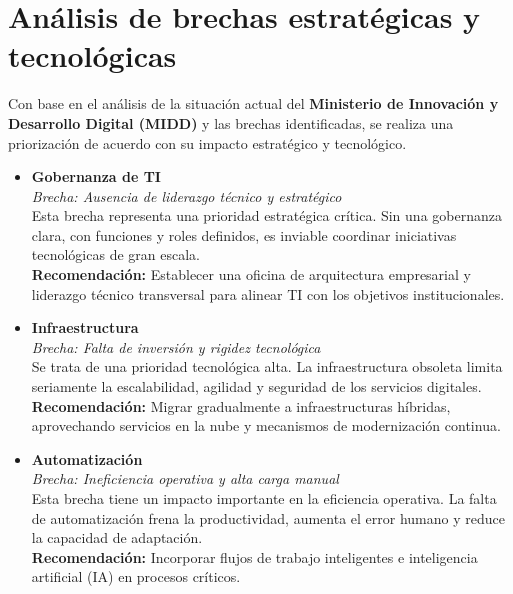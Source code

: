
\section*{Análisis de brechas estratégicas y tecnológicas}

Con base en el análisis de la situación actual del \textbf{Ministerio de Innovación y Desarrollo Digital (MIDD)} y las brechas identificadas, se realiza una priorización de acuerdo con su impacto estratégico y tecnológico.

\begin{itemize}
    \item \textbf{Gobernanza de TI} \\
    \textit{Brecha: Ausencia de liderazgo técnico y estratégico} \\
    Esta brecha representa una prioridad estratégica crítica. Sin una gobernanza clara, con funciones y roles definidos, es inviable coordinar iniciativas tecnológicas de gran escala. \\
    \textbf{Recomendación:} Establecer una oficina de arquitectura empresarial y liderazgo técnico transversal para alinear TI con los objetivos institucionales.

    \item \textbf{Infraestructura} \\
    \textit{Brecha: Falta de inversión y rigidez tecnológica} \\
    Se trata de una prioridad tecnológica alta. La infraestructura obsoleta limita seriamente la escalabilidad, agilidad y seguridad de los servicios digitales. \\
    \textbf{Recomendación:} Migrar gradualmente a infraestructuras híbridas, aprovechando servicios en la nube y mecanismos de modernización continua.

    \item \textbf{Automatización} \\
    \textit{Brecha: Ineficiencia operativa y alta carga manual} \\
    Esta brecha tiene un impacto importante en la eficiencia operativa. La falta de automatización frena la productividad, aumenta el error humano y reduce la capacidad de adaptación. \\
    \textbf{Recomendación:} Incorporar flujos de trabajo inteligentes e inteligencia artificial (IA) en procesos críticos.


\end{itemize}
